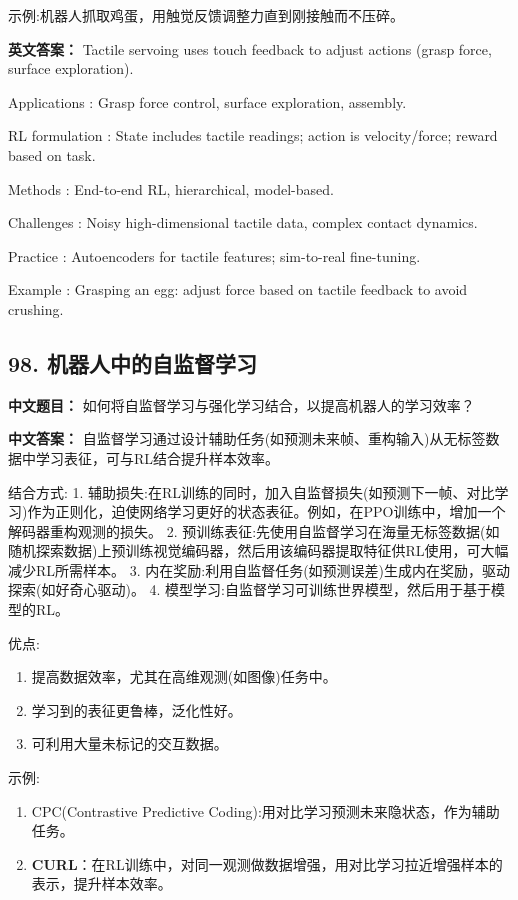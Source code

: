 \documentclass[10pt,a4paper]{ctexart}
\begin{document}
 示例:机器人抓取鸡蛋，用触觉反馈调整力直到刚接触而不压碎。

\textbf{英文答案：}  
Tactile servoing uses touch feedback to adjust actions (grasp force, surface exploration).

 Applications : Grasp force control, surface exploration, assembly.

 RL formulation : State includes tactile readings; action is velocity/force; reward based on task.

 Methods : End-to-end RL, hierarchical, model-based.

 Challenges : Noisy high-dimensional tactile data, complex contact dynamics.

 Practice : Autoencoders for tactile features; sim-to-real fine-tuning.

 Example : Grasping an egg: adjust force based on tactile feedback to avoid crushing.

\subsection*{98. 机器人中的自监督学习}
\textbf{中文题目：} 如何将自监督学习与强化学习结合，以提高机器人的学习效率？

\textbf{中文答案：}  
自监督学习通过设计辅助任务(如预测未来帧、重构输入)从无标签数据中学习表征，可与RL结合提升样本效率。

 结合方式:
1.  辅助损失:在RL训练的同时，加入自监督损失(如预测下一帧、对比学习)作为正则化，迫使网络学习更好的状态表征。例如，在PPO训练中，增加一个解码器重构观测的损失。
2.  预训练表征:先使用自监督学习在海量无标签数据(如随机探索数据)上预训练视觉编码器，然后用该编码器提取特征供RL使用，可大幅减少RL所需样本。
3.  内在奖励:利用自监督任务(如预测误差)生成内在奖励，驱动探索(如好奇心驱动)。
4.  模型学习:自监督学习可训练世界模型，然后用于基于模型的RL。

 优点:
\begin{enumerate}
    \item 提高数据效率，尤其在高维观测(如图像)任务中。
    \item 学习到的表征更鲁棒，泛化性好。
    \item 可利用大量未标记的交互数据。
\end{enumerate}

 示例:
\begin{enumerate}
    \item CPC(Contrastive Predictive Coding):用对比学习预测未来隐状态，作为辅助任务。
    \item \textbf{CURL}：在RL训练中，对同一观测做数据增强，用对比学习拉近增强样本的表示，提升样本效率。
\end{enumerate}
\end{document}

